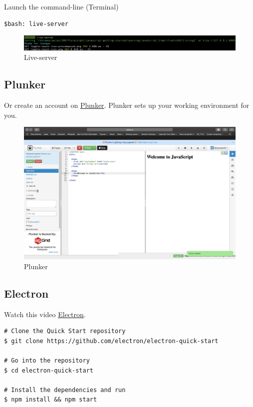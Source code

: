 \documentclass[10pt, a4paper, twocolumn]{article}
\begin{document}
Launch the command-line (Terminal)

\begin{lstlisting}
$bash: live-server
\end{lstlisting}

\begin{figure}[h!]
	\includegraphics[width=\linewidth]{liveserver.png} %
	\caption{Live-server} %
	\label{ls} %
\end{figure}

\subsection{Plunker}

Or create an account on  \href{http://plnkr.co/edit/?p=catalogue}{Plunker}.  Plunker sets up your working environment for you.

\begin{figure}[h!]
	\includegraphics[width=0.89\linewidth]{plunker.png} %
	\caption{Plunker} %
	\label{plnkr} %
\end{figure}

\subsection{Electron}

Watch this video \href{https://www.youtube.com/watch?v=8YP_nOCO-4Q&feature=youtu.be}{Electron}.

\begin{lstlisting}
# Clone the Quick Start repository
$ git clone https://github.com/electron/electron-quick-start

# Go into the repository
$ cd electron-quick-start

# Install the dependencies and run
$ npm install && npm start
\end{lstlisting}
\end{document}
